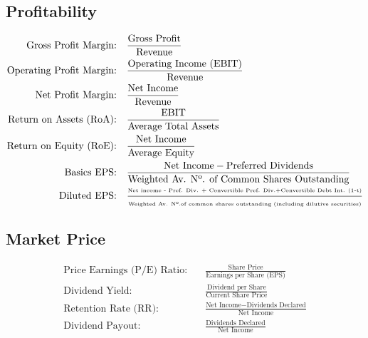 \documentclass[12pt]{article}
\begin{document}
	\subsection{Profitability}
	\begin{tcolorbox}
	\begin{align*}
		\text{Gross Profit Margin:} \quad & \frac{\text{Gross Profit}}{\text{Revenue}} \\
		\text{Operating Profit Margin:} \quad & \frac{\text{Operating Income (EBIT)}}{\text{Revenue}} \\
		\text{Net Profit Margin:} \quad & \frac{\text{Net Income}}{\text{Revenue}} \\
		\text{Return on Assets (RoA):} \quad & \frac{\text{EBIT}}{\text{Average Total Assets}} \\
		\text{Return on Equity (RoE):} \quad & \frac{\text{Net Income}}{\text{Average Equity}} \\
		\text{Basics EPS:} \quad & \frac{\text{Net Income} - \text{Preferred Dividends}}{\text{Weighted Av. Nº. of Common Shares Outstanding}} \\
		\text{Diluted EPS:} \quad & \tiny{\frac{ \text{Net income - Pref. Div. + Convertible Pref. Div.+Convertible Debt Int. (1-t)}}
			{\text{Weighted Av. Nº.of common shares outstanding (including dilutive securities)}}}		
	\end{align*}
	\end{tcolorbox}
	\subsection{Market Price}
	\begin{tcolorbox}
	\begin{align*}
		\text{Price Earnings (P/E) Ratio:} \quad & \frac{\text{Share Price}}{\text{Earnings per Share (EPS)}} \\
		\text{Dividend Yield:} \quad & \frac{\text{Dividend per Share}}{\text{Current Share Price}} \\
		\text{Retention Rate (RR):} \quad & \frac{\text{Net Income} - \text{Dividends Declared}}{\text{Net Income}} \\
		\text{Dividend Payout:} \quad & \frac{\text{Dividends Declared}}{\text{Net Income}}
	\end{align*}
	\end{tcolorbox}
\end{document}
